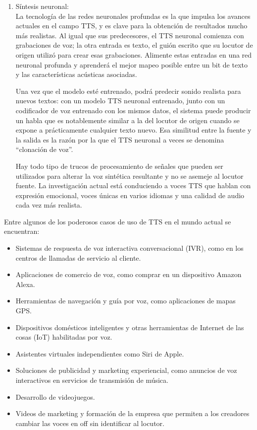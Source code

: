\begin{enumerate}
	\item Síntesis neuronal: \\ La tecnología de las redes neuronales profundas es la que impulsa los avances actuales en el campo TTS, y es clave para la obtención de resultados mucho más realistas. Al igual que sus predecesores, el TTS neuronal comienza con grabaciones de voz; la otra entrada es texto, el guión escrito que su locutor de origen utilizó para crear esas grabaciones. Alimente estas entradas en una red neuronal profunda y aprenderá el mejor mapeo posible entre un bit de texto y las características acústicas asociadas. 
	
	Una vez que el modelo esté entrenado, podrá predecir sonido realista para nuevos textos: con un modelo TTS neuronal entrenado, junto con un codificador de voz entrenado con los mismos datos, el sistema puede producir un habla que es notablemente similar a la del locutor de origen cuando se expone a prácticamente cualquier texto nuevo. Esa similitud entre la fuente y la salida	es la razón por la que el TTS neuronal a veces se denomina “clonación de voz”.
	
	Hay todo tipo de trucos de procesamiento de señales que pueden ser utilizados para alterar la voz sintética resultante y no se asemeje al locutor fuente. La investigación actual está	conduciendo a voces TTS que hablan con expresión emocional, voces únicas en varios idiomas y una calidad de audio cada vez más realista.
\end{enumerate}

Entre algunos de los poderosos casos de uso de TTS en el mundo actual se encuentran:

\begin{itemize}
	\item Sistemas de respuesta de voz interactiva conversacional (IVR), como en los centros de llamadas de servicio al cliente.
	
	\item Aplicaciones de comercio de voz, como comprar en un dispositivo Amazon Alexa.
	\item Herramientas de navegación y guía por voz, como aplicaciones de mapas GPS.
	\item Dispositivos domésticos inteligentes y otras herramientas de Internet de las cosas (IoT) habilitadas por voz.
	\item Asistentes virtuales independientes como Siri de Apple.
	\item Soluciones de publicidad y marketing experiencial, como anuncios de voz interactivos en servicios de transmisión de música.
	\item Desarrollo de videojuegos.
	\item Videos de marketing y formación de la empresa que permiten a los creadores cambiar las	voces en off sin identificar al locutor.
\end{itemize}


